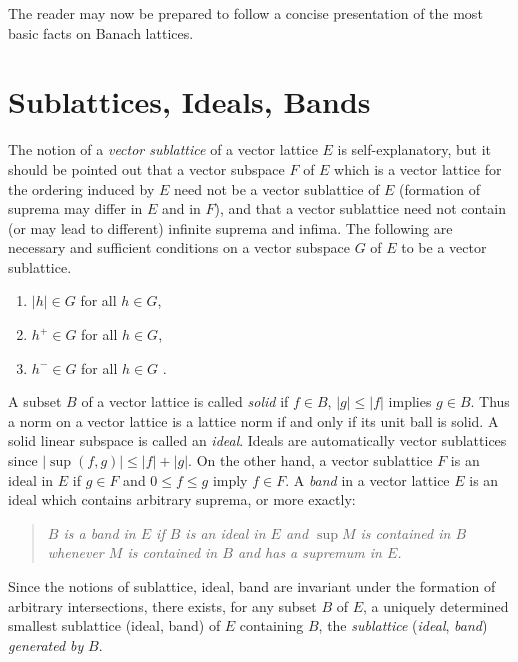 The reader may now be prepared to follow a concise presentation of the most basic facts on Banach lattices.
\section{Sublattices, Ideals, Bands}\label{sec:c1-1}%
%
%

The notion of a \emph{vector sublattice} of a vector lattice $ E $ is self-explanatory, but it should be pointed out that a vector subspace $ F $ of\/ $ E $ which is a vector lattice for the ordering induced by $ E $ need not be a vector sublattice of\/ $ E $ (formation of suprema may differ in $ E $ and in $ F $), and that a vector sublattice need not contain (or may lead to different) infinite suprema and infima.
The following are necessary and sufficient conditions on a vector subspace $ G $ of\/ $ E $ to be a vector sublattice.
\begin{enumerate}[\upshape (a)]
	\item 
	$ |h| \in G $ for all $ h \in G $, 

	\item 
	$ h^{+} \in G $ for all $ h \in G $, 
	
	\item 
	$ h^{-} \in G $ for all $ h \in G $ .
\end{enumerate}
A subset $ B $ of a vector lattice is called \emph{solid} if\/ $ f \in B $, $ |g| \leq |f| $ implies $ g \in B $.
Thus a norm on a vector lattice is a lattice norm if and only if its unit ball is solid.
A solid linear subspace is called an \emph{ideal}.
Ideals are automatically vector sublattices since $ |\sup(f,g)| \leq |f| + |g| $.
On the other hand, a vector sublattice $ F $ is an ideal in $ E $ if\/ $ g \in F $ and $ 0 \leq f \leq g $ imply $ f \in F $.
A \emph{band} in a vector lattice $ E $ is an ideal which contains arbitrary suprema, or more exactly: 
\begin{quote}
\textit{$ B $ is a band in $ E $ if\/ $ B $ is an ideal in $ E $ and $ \sup M $ is contained in $ B $ whenever $ M $ is contained in $ B $ and has a supremum in $ E $.}
\end{quote}
Since the notions of sublattice, ideal, band are invariant under the formation of arbitrary intersections, there exists, for any subset $ B $ of\/ $ E $, a uniquely determined smallest sublattice (ideal, band) of\/ $ E $ containing $ B $, \ie the \emph{sublattice} (\emph{ideal}, \emph{band}) \emph{generated by} $ B $.

